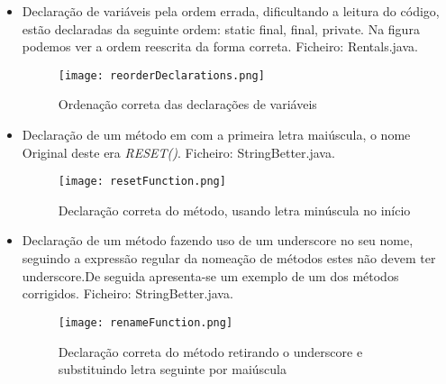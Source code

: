 \begin{itemize}
\item Declaração de variáveis pela ordem errada, dificultando a leitura do código, estão declaradas da seguinte ordem: static final, final, private. Na figura podemos ver a ordem reescrita da forma correta. \newline
 Ficheiro: Rentals.java.\newline


\begin{figure}[H]

  \centering

  \texttt{[image: reorderDeclarations.png]}

  \caption {Ordenação correta das declarações de variáveis}

  \label {fig24}

\end{figure}

\end{itemize}

\begin{itemize}
\item Declaração de um método em com a primeira letra maiúscula, o nome Original deste era \textit{RESET()}. \newline
 Ficheiro: StringBetter.java.\newline


\begin{figure}[H]

  \centering

  \texttt{[image: resetFunction.png]}

  \caption {Declaração correta do método, usando letra minúscula no início}

  \label {fig25}

\end{figure}

\end{itemize}

\begin{itemize}
\item Declaração de um método fazendo uso de um underscore no seu nome, seguindo a expressão regular da nomeação de métodos estes não devem ter underscore.De seguida apresenta-se um exemplo de um dos métodos corrigidos. \newline
 Ficheiro: StringBetter.java.\newline


\begin{figure}[H]

  \centering

  \texttt{[image: renameFunction.png]}

  \caption {Declaração correta do método retirando o underscore e substituindo letra seguinte por maiúscula}

  \label {fig26}

\end{figure}

\end{itemize}

